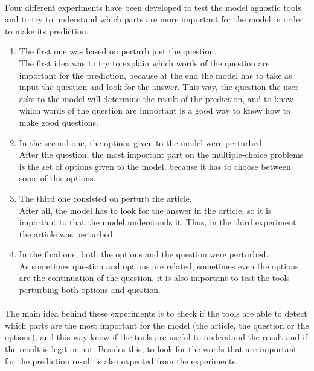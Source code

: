 \paragraph{}
Four different experiments have been developed to test the model agnostic tools and to try to understand which parts are more important for the model in order to make its prediction.
\begin{enumerate}
	\item The first one was based on perturb just the question. \\
	The first idea was to try to explain which words of the question are important for the prediction, because at the end the model has to take as input the question and look for the answer. This way, the question the user asks to the model will determine the result of the prediction, and to know which words of the question are important is a good way to know how to make good questions.
	\item In the second one, the options given to the model were perturbed. \\
	After the question, the most important part on the multiple-choice problems is the set of options given to the model, because it has to choose between some of this options.
	\item The third one consisted on perturb the article. \\
	After all, the model has to look for the answer in the article, so it is important to that the model understands it. Thus, in the third experiment the article was perturbed.
	\item In the final one, both the options and the question were perturbed. \\
	As sometimes question and options are related, sometimes even the options are the continuation of the question, it is also important to test the tools perturbing both options and question.
\end{enumerate}
\paragraph{}
The main idea behind these experiments is to check if the tools are able to detect which parts are the most important for the model (the article, the question or the options), and this way know if the tools are useful to understand the result and if the result is legit or not. Besides this, to look for the words that are important for the prediction result is also expected from the experiments. 
